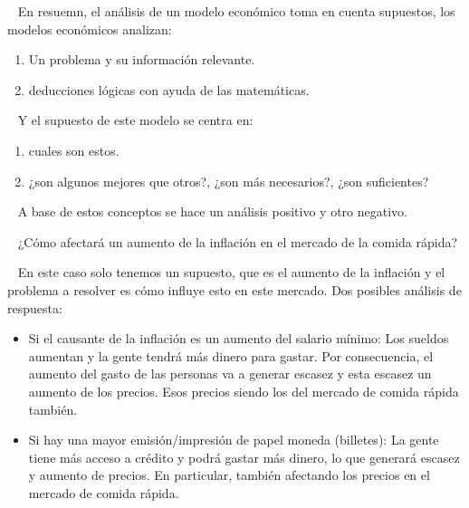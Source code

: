 \documentclass[
  letterpaper,
  DIV=11,
  numbers=noendperiod]{scrreport}
\providecommand{\tightlist}{%
  \setlength{\itemsep}{0pt}\setlength{\parskip}{0pt}}\usepackage{longtable,booktabs,array}
\begin{document}
~ En resuemn, el análisis de un modelo económico toma en cuenta
supuestos, los modelos económicos analizan:

\begin{enumerate}
\def\labelenumi{\arabic{enumi}.}
\tightlist
\item
  Un problema y su información relevante.
\item
  deducciones lógicas con ayuda de las matemáticas.
\end{enumerate}

~ Y el supuesto de este modelo se centra en:

\begin{enumerate}
\def\labelenumi{\arabic{enumi}.}
\tightlist
\item
  cuales son estos.
\item
  ¿son algunos mejores que otros?, ¿son más necesarios?, ¿son
  suficientes?
\end{enumerate}

~ A base de estos conceptos se hace un análisis positivo y otro
negativo.

\begin{tcolorbox}[enhanced jigsaw, rightrule=.15mm, colbacktitle=quarto-callout-note-color!10!white, title=\textcolor{quarto-callout-note-color}{\faInfo}\hspace{0.5em}{Ejemplo}, opacitybacktitle=0.6, breakable, colback=white, titlerule=0mm, left=2mm, bottomrule=.15mm, arc=.35mm, opacityback=0, bottomtitle=1mm, toptitle=1mm, toprule=.15mm, colframe=quarto-callout-note-color-frame, leftrule=.75mm, coltitle=black]

~ ¿Cómo afectará un aumento de la inflación en el mercado de la comida
rápida?\footnotemark{}

~ En este caso solo tenemos un supuesto, que es el aumento de la
inflación y el problema a resolver es cómo influye esto en este mercado.
Dos posibles análisis de respuesta:

\begin{itemize}
\item
  Si el causante de la inflación es un aumento del salario mínimo: Los
  sueldos aumentan y la gente tendrá más dinero para gastar. Por
  consecuencia, el aumento del gasto de las personas va a generar
  escasez y esta escasez un aumento de los precios. Esos precios siendo
  los del mercado de comida rápida también.
\item
  Si hay una mayor emisión/impresión de papel moneda (billetes): La
  gente tiene más acceso a crédito y podrá gastar más dinero, lo que
  generará escasez y aumento de precios. En particular, también
  afectando los precios en el mercado de comida rápida.
\end{itemize}

\end{tcolorbox}
\end{document}
